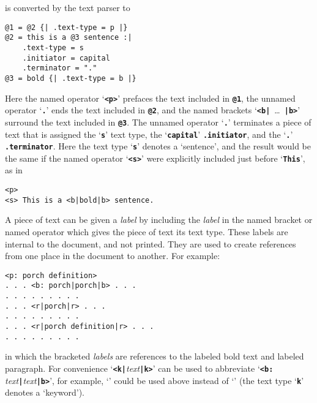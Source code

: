 \documentclass[12pt]{article}
\makeatletter
\newcommand{\TT}[1]{{\tt \bfseries #1}}
\newcommand{\ttmkey}[2]{\TT{#1}\index{#1@{\tt #1}!#2}}
\newenvironment{indpar}[1][0.3in]%
	{\begin{list}{}%
		     {\setlength{\itemsep}{0in}%
		      \setlength{\topsep}{0in}%
		      \setlength{\parsep}{1ex}%
		      \setlength{\labelwidth}{#1}%
		      \setlength{\leftmargin}{#1}%
		      \addtolength{\leftmargin}{\labelsep}}%
	 \item}%
	{\end{list}}
\makeatother
\begin{document}
is converted by the text parser to

\begin{indpar}\begin{verbatim}
@1 = @2 {| .text-type = p |}
@2 = this is a @3 sentence :|
    .text-type = s
    .initiator = capital 
    .terminator = "."
@3 = bold {| .text-type = b |}
\end{verbatim}\end{indpar}

Here the named operator `\TT{<p>}' prefaces the text included in \TT{@1},
the unnamed operator `\TT{.}' ends the text included in \TT{@2},
and the named brackets `\TT{<b|}~\ldots~\TT{|b>}' surround the text
included in \TT{@3}.  The unnamed operator `\TT{.}' terminates
a piece of text that is assigned the `\TT{s}' text type,
the `\TT{capital}' \TT{.initiator}, and
the `\TT{.}' \TT{.terminator}.  Here the text type `\TT{s}' denotes
a `sentence', and the result would be the same if
the named operator `\TT{<s>}' were explicitly included just before
`\TT{This}', as in

\begin{indpar}\begin{verbatim}
<p>
<s> This is a <b|bold|b> sentence.
\end{verbatim}\end{indpar}

A piece of text can be given a {\em label} by including the {\em label}
in the named bracket or named operator which gives the piece of text
its text type.
These labels are internal to the document, and not printed.
They are used to create references from one place in the document to
another.  For example:

\begin{indpar}\begin{verbatim}
<p: porch definition>
. . . <b: porch|porch|b> . . .
. . . . . . . . .
. . . <r|porch|r> . . .
. . . . . . . . .
. . . <r|porch definition|r> . . .
. . . . . . . . .
\end{verbatim}\end{indpar}

in which the \TT{<r|  |r>} bracketed {\em labels} are references
to the labeled bold text and labeled paragraph.  For convenience
`\TT{<k|}{\em text}\TT{|k>}' can be used to abbreviate
`\TT{<b:} {\em text}\TT{|}{\em text}\TT{|b>}', for example,
`\TT{<k|porch|k>}' could be used above instead of
`\TT{<b: porch|porch|b>}' (the text type `\ttmkey{k}{text type}'
denotes a `keyword').
\end{document}
